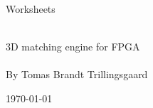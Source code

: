 \begin{center}
\begin{Huge}
Worksheets\\~\\
\end{Huge}
\begin{LARGE}
3D matching engine for FPGA\\~\\

By Tomas Brandt Trillingsgaard\\
\end{LARGE}
\begin{Large}
\today
\end{Large}


\end{center}